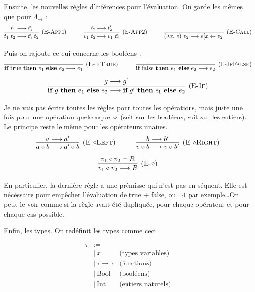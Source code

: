 \documentclass[11pt]{article}
\begin{document}
Ensuite, les nouvelles règles d'inférences pour l'évaluation. On garde les mêmes que pour $\Lambda_\rightarrow$ :
$$
\infer[(\text{\scshape{E-App1}})]{t_1~t_2\longrightarrow t_1'~t_2}{t_1\longrightarrow t_1'}
~~~~~~~~~
\infer[(\text{\scshape{E-App2}})]{v_1~t_2\longrightarrow v_1~t_2'}{t_2\longrightarrow t_2'}
~~~~~~~~~
\infer[(\text{\scshape{E-Call}})]{(\lambda x.~e)~v_2\longrightarrow e[x\leftarrow v_2]}{}
$$

Puis on rajoute ce qui concerne les booléens :
$$
\infer[(\text{\scshape{E-IfTrue}})]{\textbf{if}~\text{true}~\textbf{then}~e_1~\textbf{else}~e_2\longrightarrow e_1}{}
~~~~~~~~~
\infer[(\text{\scshape{E-IfFalse}})]{\textbf{if}~\text{false}~\textbf{then}~e_1~\textbf{else}~e_2\longrightarrow e_2}{}
$$
$$
\infer[(\text{\scshape{E-If}})]{\textbf{if}~g~\textbf{then}~e_1~\textbf{else}~e_2\longrightarrow \textbf{if}~g'~\textbf{then}~e_1~\textbf{else}~e_2}{g\longrightarrow g'}
$$

Je ne vais pas écrire toutes les règles pour toutes les opérations, mais juste une fois pour une opération quelconque $\diamond$ (soit sur les booléens, soit sur les entiers). Le principe reste le même pour les opérateurs unaires.
$$
\infer[(\text{\scshape{E-$\diamond$Left}})]{a\diamond b\longrightarrow a'\diamond b}{a\longrightarrow a'}
~~~~~~~~~
\infer[(\text{\scshape{E-$\diamond$Right}})]{v\diamond b\longrightarrow v\diamond b'}{b\longrightarrow b'}
$$
$$
\infer[(\text{\scshape{E-$\diamond$}})]{v_1\diamond v_2\longrightarrow R}{v_1\diamond v_2=R}
$$

En particulier, la dernière règle a une prémisse qui n'est pas un séquent. Elle est nécéssaire pour empêcher l'évaluation de true + false, ou $\neg 1$ par exemple\dots On peut le voir comme si la règle avait été dupliquée, pour chaque opérateur et pour chaque cas possible.

Enfin, les types. On redéfinit les types comme ceci :

\begin{equation*}
\begin{aligned}
    \tau &:=\\
    &|~x&\text{(types variables)}\\
    &|~\tau\to\tau&\text{(fonctions)}\\
    &|~\text{Bool}&\text{(booléens)}\\
    &|~\text{Int}&\text{(entiers naturels)}\\
\end{aligned}
\end{equation*}
\end{document}
